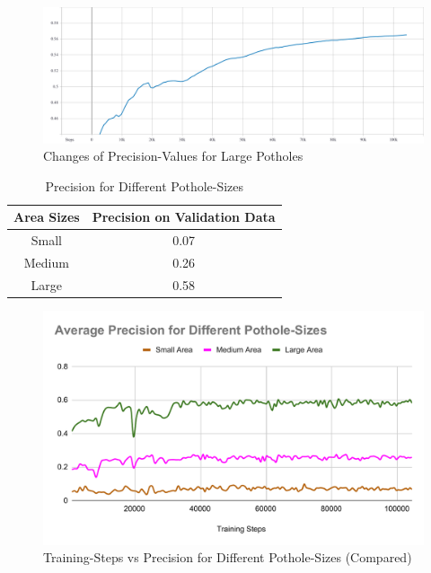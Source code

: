             \begin{figure}
                \centering
                \includegraphics[width=\textwidth]{images/mAP-large.pdf}
                \caption{Changes of Precision-Values for Large Potholes}
                \label{fig:precision_sizes_large}
            \end{figure}
            
            \begin{table}
                \centering
                \begin{tabular}{|c||c|} \hline 
                     Area Sizes  &  Precision on Validation Data \\\hline\hline
                     Small  &  0.07 \\\hline
                     Medium  &  0.26 \\\hline
                     Large  &  0.58 \\\hline
                \end{tabular}
                \caption{Precision for Different Pothole-Sizes}
                \label{tab:precision_sizes}
            \end{table}
            
            \clearpage
            \begin{figure}
                \centering
                \includegraphics[width=\textwidth]{images/Average Precision for Different Pothole-Sizes.pdf}
                \caption{Training-Steps vs Precision for Different Pothole-Sizes (Compared)}
                \label{fig:precision_sizes}
            \end{figure}
            
